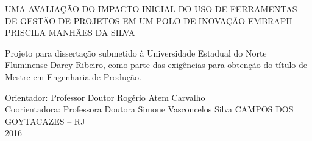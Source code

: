 \begin{titlepage}
 \begin{center}
   {\large UMA AVALIAÇÃO DO IMPACTO INICIAL DO USO DE FERRAMENTAS DE GESTÃO DE PROJETOS EM UM POLO DE INOVAÇÃO EMBRAPII} \\ [5cm]
   {\large PRISCILA MANHÃES DA SILVA} \\ [1.5cm]
   \hspace{.45\textwidth} %
   \begin{minipage}{0.5\textwidth}
   \begin{espacosimples}
        Projeto para dissertação submetido à Universidade Estadual do Norte Fluminense Darcy Ribeiro, como parte das exigências para obtenção do título de Mestre em Engenharia de Produção. \\[5cm]
    \end{espacosimples}
    \end{minipage}
    {\normalsize Orientador: Professor Doutor Rogério Atem Carvalho}\\
    {\normalsize Coorientadora: Professora Doutora Simone Vasconcelos Silva}
   \vfill
   {\large CAMPOS DOS GOYTACAZES – RJ} \\
   {\large 2016}
 \end{center}
\end{titlepage}
